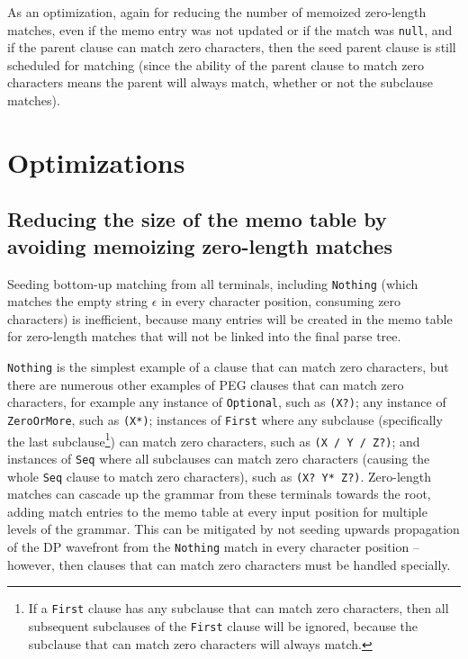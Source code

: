 \documentclass[manuscript,screen]{acmart}
\begin{document}
As an optimization, again for reducing the number of memoized zero-length matches, even if the memo entry was not updated or if the match was \texttt{null}, and if the parent clause can match zero characters, then the seed parent clause is still scheduled for matching (since the ability of the parent clause to match zero characters means the parent will always match, whether or not the subclause matches).

\section{Optimizations}

\subsection{\label{sec:zerolen}Reducing the size of the memo table by avoiding memoizing zero-length matches}

Seeding bottom-up matching from all terminals, including \texttt{Nothing} (which matches the empty string $\epsilon$ in every character position, consuming zero characters) is inefficient, because many entries will be created in the memo table for zero-length matches that will not be linked into the final parse tree.

\texttt{Nothing} is the simplest example of a clause that can match zero characters, but there are numerous other examples of PEG clauses that can match zero characters, for example any instance of \texttt{Optional}, such as \texttt{(X?)}; any instance of \texttt{ZeroOrMore}, such as \texttt{(X*)}; instances of \texttt{First} where any subclause (specifically the last subclause\footnote{If a \texttt{First} clause has any subclause that can match zero characters, then all subsequent subclauses of the \texttt{First} clause will be ignored, because the subclause that can match zero characters will always match.}) can match zero characters, such as \texttt{(X / Y / Z?)}; and instances of \texttt{Seq} where all subclauses can match zero characters (causing the whole \texttt{Seq} clause to match zero characters), such as \texttt{(X? Y* Z?)}. Zero-length matches can cascade up the grammar from these terminals towards the root, adding match entries to the memo table at every input position for multiple levels of the grammar. This can be mitigated by not seeding upwards propagation of the DP wavefront from the \texttt{Nothing} match in every character position -- however, then clauses that can match zero characters must be handled specially.
\end{document}
